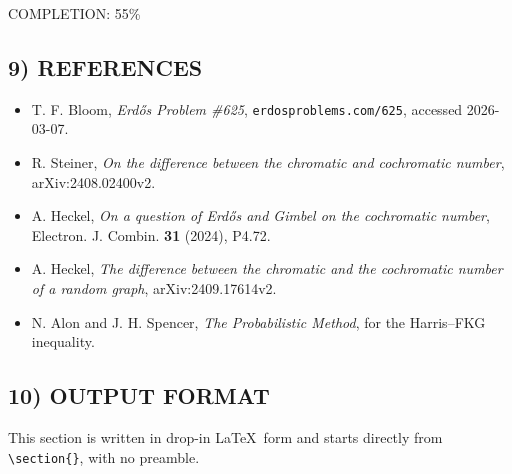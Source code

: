 COMPLETION: 55\%

\subsection*{9) REFERENCES}

\begin{itemize}
\item T. F. Bloom, \emph{Erd\H{o}s Problem \#625}, \texttt{erdosproblems.com/625}, accessed 2026-03-07.
\item R. Steiner, \emph{On the difference between the chromatic and cochromatic number}, arXiv:2408.02400v2.
\item A. Heckel, \emph{On a question of Erd\H{o}s and Gimbel on the cochromatic number}, Electron. J. Combin. \textbf{31} (2024), P4.72.
\item A. Heckel, \emph{The difference between the chromatic and the cochromatic number of a random graph}, arXiv:2409.17614v2.
\item N. Alon and J. H. Spencer, \emph{The Probabilistic Method}, for the Harris--FKG inequality.
\end{itemize}

\subsection*{10) OUTPUT FORMAT}

This section is written in drop-in \LaTeX\ form and starts directly from \verb|\section{}|, with no preamble.
